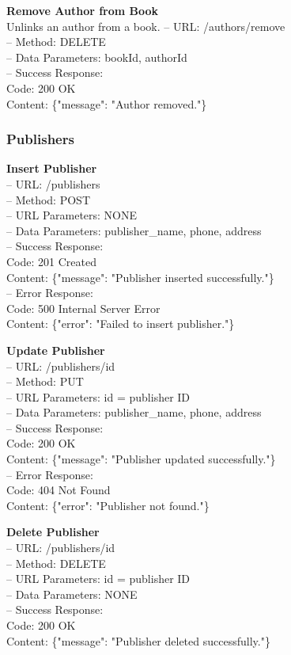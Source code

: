 \textbf{Remove Author from Book} \\
Unlinks an author from a book.
– URL: /authors/remove \\
– Method: DELETE \\
– Data Parameters: bookId, authorId \\
– Success Response: \\
Code: 200 OK \\
Content: \{"message": "Author removed."\}

\subsubsection*{Publishers}

\textbf{Insert Publisher} \\
– URL: /publishers \\
– Method: POST \\
– URL Parameters: NONE \\
– Data Parameters: publisher_name, phone, address \\
– Success Response: \\
Code: 201 Created \\
Content: \{"message": "Publisher inserted successfully."\} \\
– Error Response: \\
Code: 500 Internal Server Error \\
Content: \{"error": "Failed to insert publisher."\}

\textbf{Update Publisher} \\
– URL: /publishers/{id} \\
– Method: PUT \\
– URL Parameters: id = publisher ID \\
– Data Parameters: publisher_name, phone, address \\
– Success Response: \\
Code: 200 OK \\
Content: \{"message": "Publisher updated successfully."\} \\
– Error Response: \\
Code: 404 Not Found \\
Content: \{"error": "Publisher not found."\}

\textbf{Delete Publisher} \\
– URL: /publishers/{id} \\
– Method: DELETE \\
– URL Parameters: id = publisher ID \\
– Data Parameters: NONE \\
– Success Response: \\
Code: 200 OK \\
Content: \{"message": "Publisher deleted successfully."\}



